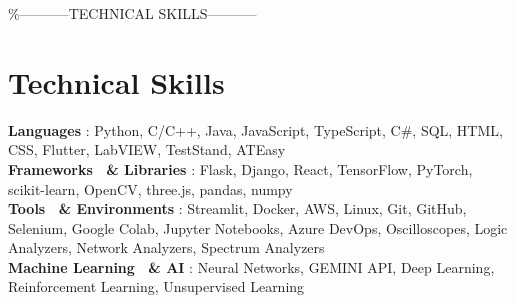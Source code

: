 \documentclass[letterpaper,10pt]{article}
\begin{document}
\%-----------TECHNICAL SKILLS-----------
\section{Technical Skills}
 \begin{itemize}[leftmargin=0.15in, label={}]
    \small{\item{
     \textbf{Languages} {: Python, C/C++, Java, JavaScript, TypeScript, C\#, SQL, HTML, CSS, Flutter, LabVIEW, TestStand, ATEasy} \\
     \textbf{Frameworks \ \& Libraries} {: Flask, Django, React, TensorFlow, PyTorch, scikit-learn, OpenCV, three.js, pandas, numpy} \\
     \textbf{Tools \ \& Environments} {: Streamlit, Docker, AWS, Linux, Git, GitHub, Selenium, Google Colab, Jupyter Notebooks, Azure DevOps, Oscilloscopes, Logic Analyzers, Network Analyzers, Spectrum Analyzers} \\
     \textbf{Machine Learning \ \& AI} {: Neural Networks, GEMINI API, Deep Learning, Reinforcement Learning, Unsupervised Learning} \\
    }}
 \end{itemize}
\end{document}
